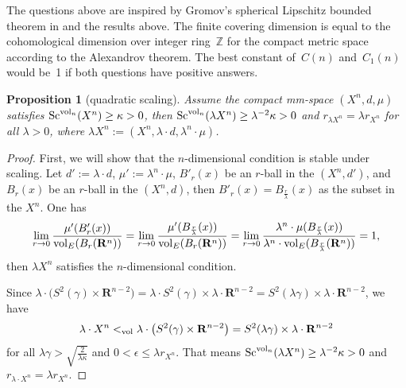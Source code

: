 \documentclass[pdftex]{sigma}
\newtheorem{Proposition}[Theorem]{Proposition}
\begin{document}
\begin{Remark}
The questions above are inspired by Gromov's spherical Lipschitz bounded theorem in \cite[Section~3]{MR3816521} and the results above. The finite covering dimension is equal to the cohomological dimension over integer ring~$\mathbb{Z}$ for the compact metric space according to the Alexandrov theorem. The best constant of~$C(n)$ and~$C_1(n)$ would be~1 if both questions have positive answers.
\end{Remark}

\begin{Proposition}[quadratic scaling] Assume the compact mm-space $(X^n, d, \mu)$ satisfies \linebreak ${\rm Sc}^{{\rm vol}_n}(X^n)\geq \kappa> 0$, then ${\rm Sc}^{{\rm vol}_n}(\lambda X^n)\geq \lambda ^{-2}\kappa> 0$ and $r_{\lambda X^n}=\lambda r_{X^n}$ for all $\lambda>0$, where $\lambda X^n:=(X^n, \lambda \cdot d,\lambda^n \cdot \mu)$.
 \end{Proposition}

\begin{proof}
 First, we will show that the $n$-dimensional condition is stable under scaling. Let $d':=\lambda\cdot d$, $\mu':=\lambda^n \cdot \mu$, $B'_r(x)$ be an $r$-ball in the $(X^n,d')$, and $B_r(x)$ be an $r$-ball in the $(X^n,d)$, then $B'_r(x)=B_{\frac{r}{\lambda}}(x)$ as the subset in the $X^n$. One has
 \begin{gather*}
 \lim\limits_{r \to 0}\frac{\mu'(B'_r(x))}{{\rm vol}_E(B_r(\mathbf{R}^n))}=\lim\limits_{r \to 0}\frac{\mu'(B_{\frac{r}{\lambda}}(x))}{{\rm vol}_E(B_r(\mathbf{R}^n))}=\lim\limits_{r \to 0}\frac{\lambda^n \cdot \mu(B_{\frac{r}{\lambda}}(x))}{\lambda^n \cdot {\rm vol}_E(B_{\frac{r}{\lambda}}(\mathbf{R}^n))}=1,
\end{gather*}
 then $\lambda X^n$ satisfies the $n$-dimensional condition.

 Since $\lambda \cdot \big(S^2(\gamma)\times \mathbf{R}^{n-2} \big)=\lambda \cdot S^2(\gamma)\times \lambda\cdot\mathbf{R}^{n-2}=S^2(\lambda \gamma)\times \lambda\cdot\mathbf{R}^{n-2}$, we have
 \begin{gather*}
 \lambda \cdot X^n<_{\rm vol}\lambda \cdot \big(S^2(\gamma)\times \mathbf{R}^{n-2} \big)=S^2(\lambda \gamma)\times \lambda\cdot\mathbf{R}^{n-2}
 \end{gather*}
 for all $\lambda\gamma> \sqrt{\frac{2}{\lambda\kappa}}$ and $0 < \epsilon \leq \lambda r_{X^n}$. That means ${\rm Sc}^{{\rm vol}_n}(\lambda X^n)\geq \lambda ^{-2}\kappa> 0$ and $r_{\lambda \cdot X^n}=\lambda r_{X^n}$.
 \end{proof}
\end{document}
